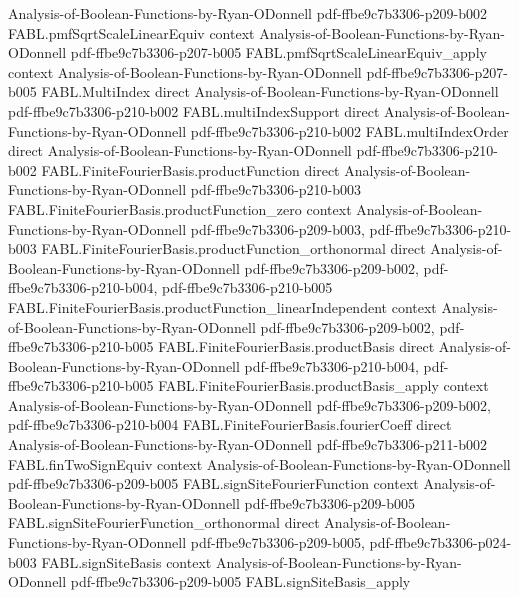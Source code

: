 \begin{theorem}
  {Analysis-of-Boolean-Functions-by-Ryan-ODonnell}
  {pdf-ffbe9c7b3306-p209-b002}
\proofstep
  {FABL.pmfSqrtScaleLinearEquiv}
  {context}
  {Analysis-of-Boolean-Functions-by-Ryan-ODonnell}
  {pdf-ffbe9c7b3306-p207-b005}
\proofstep
  {FABL.pmfSqrtScaleLinearEquiv_apply}
  {context}
  {Analysis-of-Boolean-Functions-by-Ryan-ODonnell}
  {pdf-ffbe9c7b3306-p207-b005}
\proofstep
  {FABL.MultiIndex}
  {direct}
  {Analysis-of-Boolean-Functions-by-Ryan-ODonnell}
  {pdf-ffbe9c7b3306-p210-b002}
\proofstep
  {FABL.multiIndexSupport}
  {direct}
  {Analysis-of-Boolean-Functions-by-Ryan-ODonnell}
  {pdf-ffbe9c7b3306-p210-b002}
\proofstep
  {FABL.multiIndexOrder}
  {direct}
  {Analysis-of-Boolean-Functions-by-Ryan-ODonnell}
  {pdf-ffbe9c7b3306-p210-b002}
\proofstep
  {FABL.FiniteFourierBasis.productFunction}
  {direct}
  {Analysis-of-Boolean-Functions-by-Ryan-ODonnell}
  {pdf-ffbe9c7b3306-p210-b003}
\proofstep
  {FABL.FiniteFourierBasis.productFunction_zero}
  {context}
  {Analysis-of-Boolean-Functions-by-Ryan-ODonnell}
  {pdf-ffbe9c7b3306-p209-b003,
    pdf-ffbe9c7b3306-p210-b003}
\proofstep
  {FABL.FiniteFourierBasis.productFunction_orthonormal}
  {direct}
  {Analysis-of-Boolean-Functions-by-Ryan-ODonnell}
  {pdf-ffbe9c7b3306-p209-b002,
    pdf-ffbe9c7b3306-p210-b004,
    pdf-ffbe9c7b3306-p210-b005}
\proofstep
  {FABL.FiniteFourierBasis.productFunction_linearIndependent}
  {context}
  {Analysis-of-Boolean-Functions-by-Ryan-ODonnell}
  {pdf-ffbe9c7b3306-p209-b002,
    pdf-ffbe9c7b3306-p210-b005}
\proofstep
  {FABL.FiniteFourierBasis.productBasis}
  {direct}
  {Analysis-of-Boolean-Functions-by-Ryan-ODonnell}
  {pdf-ffbe9c7b3306-p210-b004,
    pdf-ffbe9c7b3306-p210-b005}
\proofstep
  {FABL.FiniteFourierBasis.productBasis_apply}
  {context}
  {Analysis-of-Boolean-Functions-by-Ryan-ODonnell}
  {pdf-ffbe9c7b3306-p209-b002,
    pdf-ffbe9c7b3306-p210-b004}
\proofstep
  {FABL.FiniteFourierBasis.fourierCoeff}
  {direct}
  {Analysis-of-Boolean-Functions-by-Ryan-ODonnell}
  {pdf-ffbe9c7b3306-p211-b002}
\proofstep
  {FABL.finTwoSignEquiv}
  {context}
  {Analysis-of-Boolean-Functions-by-Ryan-ODonnell}
  {pdf-ffbe9c7b3306-p209-b005}
\proofstep
  {FABL.signSiteFourierFunction}
  {context}
  {Analysis-of-Boolean-Functions-by-Ryan-ODonnell}
  {pdf-ffbe9c7b3306-p209-b005}
\proofstep
  {FABL.signSiteFourierFunction_orthonormal}
  {direct}
  {Analysis-of-Boolean-Functions-by-Ryan-ODonnell}
  {pdf-ffbe9c7b3306-p209-b005,
    pdf-ffbe9c7b3306-p024-b003}
\proofstep
  {FABL.signSiteBasis}
  {context}
  {Analysis-of-Boolean-Functions-by-Ryan-ODonnell}
  {pdf-ffbe9c7b3306-p209-b005}
\proofstep
  {FABL.signSiteBasis_apply}

\end{theorem}
